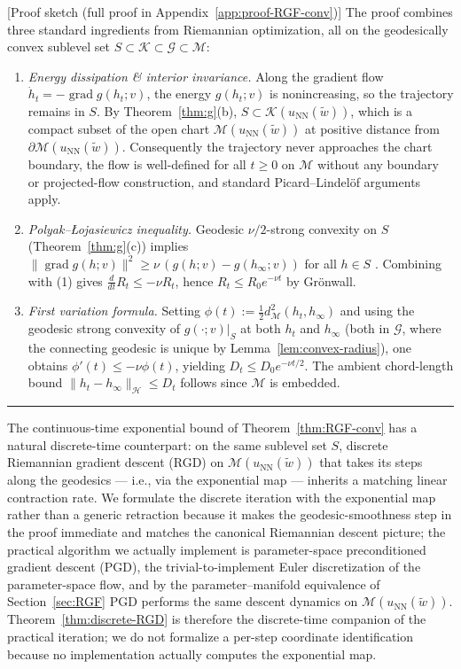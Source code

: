 \documentclass[twoside,11pt]{article}
\newcommand{\BlackBoxProof}{\rule{1.5ex}{1.5ex}}
\renewenvironment{proof}{\par\noindent{\bf Proof\ }}{\hfill\BlackBoxProof\par\medskip}
\newcommand{\grad}{\operatorname{grad} }
\newcommand{\NN}{\mathrm{NN}}
\newcommand{\calG}{\mathcal{G}}
\newcommand{\calH}{\mathcal{H}}
\newcommand{\calK}{\mathcal{K}}
\newcommand{\calM}{\mathcal{M}}
\begin{document}
\begin{proof}[Proof sketch (full proof in Appendix~\ref{app:proof-RGF-conv})]
The proof combines three standard ingredients from Riemannian optimization, all on the geodesically convex sublevel set $S\subset \calK \subset \calG \subset \calM$:
\begin{enumerate}
\item \emph{Energy dissipation \& interior invariance.} Along the gradient flow $\dot h_t=-\grad g(h_t;v)$, the energy $g(h_t;v)$ is nonincreasing, so the trajectory remains in $S$. By Theorem~\ref{thm:g}(b), $S \subset \calK(u_\NN(\tilde w))$, which is a compact subset of the open chart $\calM(u_\NN(\tilde w))$ at positive distance from $\partial\calM(u_\NN(\tilde w))$. Consequently the trajectory never approaches the chart boundary, the flow is well-defined for all $t \ge 0$ on $\calM$ without any boundary or projected-flow construction, and standard Picard--Lindel\"of arguments apply.
\item \emph{Polyak--\L{}ojasiewicz inequality.} Geodesic $\nu/2$-strong convexity on $S$ (Theorem~\ref{thm:g}(c)) implies
$\|\grad g(h;v)\|^2\ge \nu\,(g(h;v)-g(h_\infty;v))$ for all $h\in S$
\citep[Lemma~11.28]{boumal2023intromanifolds}.
Combining with (1) gives $\frac{d}{dt}R_t\le -\nu R_t$, hence $R_t\le R_0 e^{-\nu t}$ by Gr\"onwall.
\item \emph{First variation formula.} Setting $\phi(t):=\frac12 d_\calM^2(h_t,h_\infty)$ and
using the geodesic strong convexity of $g(\cdot;v)|_S$ at both $h_t$ and $h_\infty$ (both in $\calG$, where the connecting geodesic is unique by Lemma~\ref{lem:convex-radius}),
one obtains $\phi'(t)\le -\nu\phi(t)$, yielding $D_t\le D_0 e^{-\nu t/2}$. The ambient
chord-length bound $\|h_t-h_\infty\|_\calH\le D_t$ follows since $\calM$ is embedded.
\end{enumerate}
\end{proof}

The continuous-time exponential bound of Theorem~\ref{thm:RGF-conv} has a natural discrete-time counterpart: on the same sublevel set $S$, discrete Riemannian gradient descent (RGD) on $\calM(u_\NN(\tilde w))$ that takes its steps along the geodesics --- i.e., via the exponential map --- inherits a matching linear contraction rate. We formulate the discrete iteration with the exponential map rather than a generic retraction because it makes the geodesic-smoothness step in the proof immediate and matches the canonical Riemannian descent picture; the practical algorithm we actually implement is parameter-space preconditioned gradient descent (PGD), the trivial-to-implement Euler discretization of the parameter-space flow, and by the parameter--manifold equivalence of Section~\ref{sec:RGF} PGD performs the same descent dynamics on $\calM(u_\NN(\tilde w))$. Theorem~\ref{thm:discrete-RGD} is therefore the discrete-time companion of the practical iteration; we do not formalize a per-step coordinate identification because no implementation actually computes the exponential map.
\end{document}
